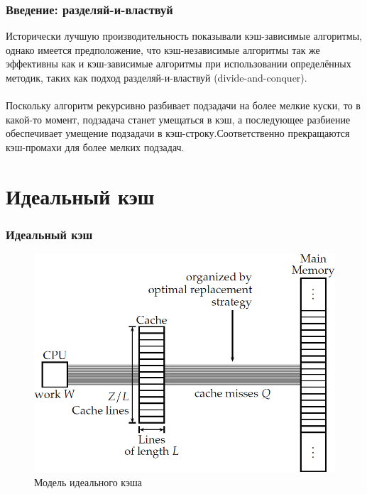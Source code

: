 \documentclass{beamer}
\begin{document}
\begin{frame}
\frametitle{Введение: разделяй-и-властвуй}

Исторически лучшую производительность показывали кэш-зависимые алгоритмы, однако имеется предположение, что кэш-независимые алгоритмы так же эффективны как и кэш-зависимые алгоритмы при использовании определённых методик, таких как подход разделяй-и-властвуй (divide-and-conquer).\\~\\

Поскольку алгоритм рекурсивно разбивает подзадачи на более мелкие куски, то в какой-то момент, подзадача станет умещаться в кэш, а последующее разбиение обеспечивает умещение подзадачи в
кэш-строку.Соответственно прекращаются кэш-промахи для более мелких подзадач.
\end{frame}

\section{Идеальный кэш}

\begin{frame}
\frametitle{Идеальный кэш}

\begin{figure}
\includegraphics[scale=0.35]{res/pic001}
\caption{Модель идеального кэша}
\end{figure}

\end{frame}
\end{document}

